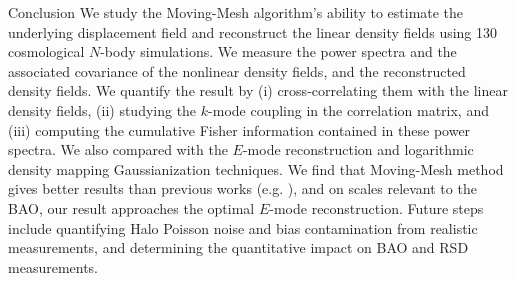 \begin{section}{Conclusion}
  \label{sec:conclusion}
  We study the Moving-Mesh algorithm's ability to estimate the underlying displacement 
  field and reconstruct the linear density fields using 130 cosmological $N$-body 
  simulations.  We measure the power spectra and the associated covariance of the 
  nonlinear density fields, and the reconstructed density fields.  We quantify the 
  result by (i) cross-correlating them with the linear density fields, (ii) studying 
  the $k$-mode coupling in the correlation matrix, and (iii) computing the cumulative 
  Fisher information contained in these power spectra.  We also
  compared with the $E$-mode 
  reconstruction and logarithmic density mapping Gaussianization
  techniques.
We find that Moving-Mesh method gives better results than previous works
  (e.g. \cite{bib:Mark2009,bib:Zhang2011,bib:HarnoisD2013}), and on scales 
  relevant to the BAO, our result approaches the optimal $E$-mode reconstruction.  
  Future steps include quantifying Halo Poisson noise and bias contamination 
  from realistic measurements, and determining the quantitative impact on
  BAO and RSD measurements.  

%
\end{section}
